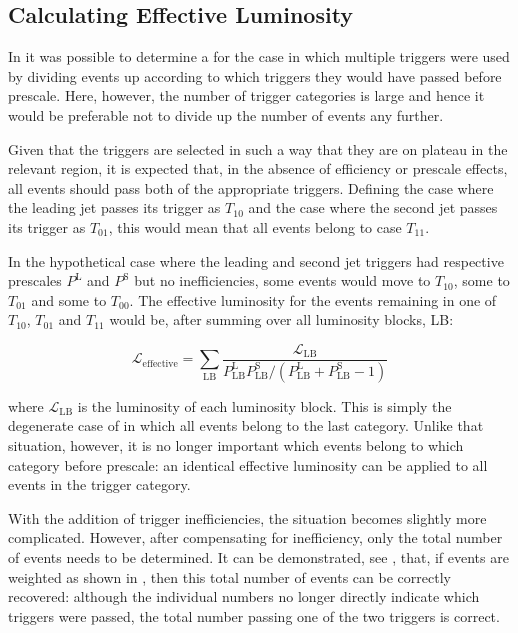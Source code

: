 \subsection{Calculating Effective Luminosity}
\label{sec:dijets:effective_luminosity}
In  it was possible to determine
a \xs for the case in which multiple triggers were used by dividing events up according
to which triggers they would have passed before prescale. Here, however, the number
of trigger categories is large and hence it would be preferable not to divide up the number
of events any further.

Given that the triggers are selected in such a way that they are on plateau in the
relevant region, it is expected that, in the absence of efficiency or prescale
effects, all events should pass both of the appropriate triggers. Defining the case where the leading
jet passes its trigger as $T_{10}$ and the case where the second jet passes its trigger
as $T_{01}$, this would mean that all events belong to case $T_{11}$.

In the hypothetical case where the leading and second jet triggers had respective
prescales $P^{\mathrm{L}}$ and $P^{\mathrm{S}}$ but no inefficiencies, some events would
move to $T_{10}$, some to $T_{01}$ and some to $T_{00}$. The effective luminosity
for the events remaining in one of $T_{10}$, $T_{01}$ and $T_{11}$ would be,
after summing over all luminosity blocks, LB:

\begin{equation}
  \mathcal{L}_{\mathrm{effective}} = \sum_{\mathrm{LB}} \frac{\mathcal{L}_{\mathrm{LB}}}{P^{\mathrm{L}}_{\mathrm{LB}} P^{\mathrm{S}}_{\mathrm{LB}}/(P^{\mathrm{L}}_{\mathrm{LB}} + P^{\mathrm{S}}_{\mathrm{LB}}-1)}
\end{equation}

\noindent where $\mathcal{L}_{\mathrm{LB}}$ is the luminosity of each luminosity block.
This is simply the degenerate case of 
in which all events belong to the last category. Unlike that situation, however,
it is no longer important which events belong to which category before prescale: an
identical effective luminosity can be applied to all events in the trigger category.

With the addition of trigger inefficiencies, the situation becomes slightly more
complicated. However, after compensating for inefficiency, only the total number
of events needs to be determined. It can be demonstrated, see ,
that, if events are weighted as shown in , then this total
number of events can be correctly recovered: although the individual
numbers no longer directly indicate which triggers were passed, the total number
passing one of the two triggers is correct.

